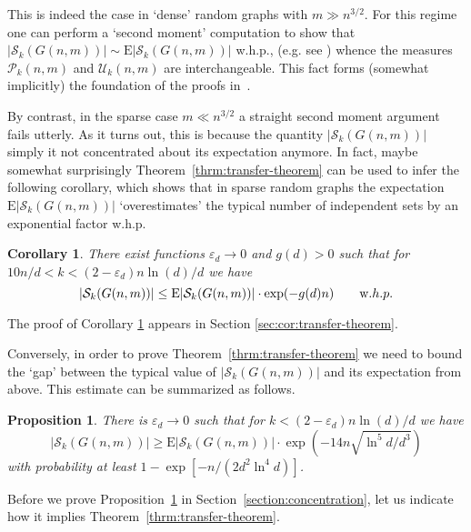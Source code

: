 \documentclass[a4paper,10pt]{article}
\newtheorem{proposition}{Proposition}\renewcommand{\theproposition}{\arabic{proposition}}
\newtheorem{corollary}{Corollary}\renewcommand{\thecorollary}{\arabic{corollary}}
\newcommand\cU{\mathcal{U}}
\newcommand\cS{\mathcal{S}}
\newcommand\cP{\mathcal{P}}
\newcommand\eps{\varepsilon}
\newcommand\Erw{\mathrm{E}}
\newcommand\ra{\rightarrow}
\newcommand\bc[1]{\left({#1}\right)}
\newcommand{\whp}{w.h.p.}
\newcommand\Prop{Proposition}
\newcommand\Thm{Theorem}
\newcommand\Sec{Section}
\begin{document}
This is indeed the case in `dense' random graphs with $m\gg n^{3/2}$.
For this regime one can perform a `second moment' computation to show
that $|\cS_k(G(n,m))|\sim\Erw|\cS_k(G(n,m))|$ \whp, (e.g. see \cite[Chapter~7]{janson}) 
whence the measures $\cP_k(n,m)$ and $\cU_k(n,m)$ are interchangeable.
This fact forms (somewhat implicitly) the foundation of the proofs
in~\cite{jerrum-planted}.



By contrast, in the sparse case $m\ll n^{3/2}$ a straight second
moment argument fails utterly. As it turns out, this is because
the quantity $|\cS_k(G(n,m))|$ simply it not concentrated about
its expectation anymore. In fact, maybe somewhat surprisingly
\Thm~\ref{thrm:transfer-theorem} can be used to infer the following
corollary, which shows that in sparse random graphs the expectation
$\Erw|\cS_k(G(n,m))|$ `overestimates' the typical number of independent
sets by an exponential factor \whp\

\begin{corollary}\label{cor:transfer-theorem}
There exist functions $\eps_d\ra 0$ and $g(d)>0$ such that for
$10n/d < k<(2-\eps_d)n\ln(d)/d$ we have
$$|\cS_k(G(n,m))|\leq\Erw|\cS_k(G(n,m))|\cdot\exp(-g(d)n)\qquad\mbox\whp$$
\end{corollary}
The proof of Corollary \ref{cor:transfer-theorem} appears in Section
\ref{sec:cor:transfer-theorem}.


Conversely, in order to prove \Thm~\ref{thrm:transfer-theorem} we
need to bound the `gap' between the typical value of $|\cS_k(G(n,m))|$
and its expectation from above. This estimate can be summarized as
follows.


\begin{proposition}\label{Lemma_gap}
There is $\eps_d\ra0$ such that for $k<(2-\eps_d)n\ln(d)/d$ we have
$$|\cS_k(G(n,m))|\geq\Erw|\cS_k(G(n,m))|\cdot\exp\bc{-14n\sqrt{\ln^5d/d^3}}$$
with probability at least $1-\exp\left[-n/(2d^2\ln^4d) \right ]$.
\end{proposition}
Before we prove \Prop~\ref{Lemma_gap} in \Sec~\ref{section:concentration},
let us indicate how it implies \Thm~\ref{thrm:transfer-theorem}.
\end{document}
